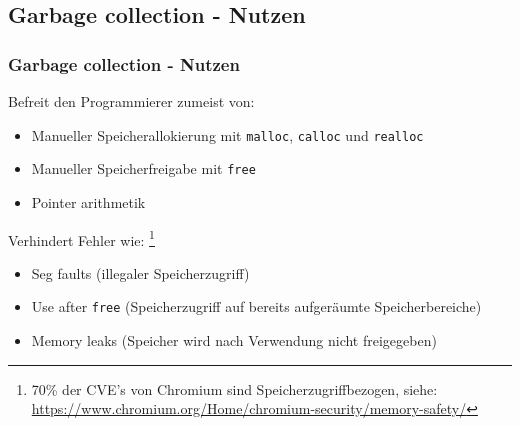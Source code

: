 \documentclass{beamer}
\begin{document}
        \subsection{Garbage collection - Nutzen}
            \begin{frame}
                \frametitle{Garbage collection - Nutzen}

                Befreit den Programmierer zumeist von:
                \begin{itemize}
                    \item Manueller Speicherallokierung mit \texttt{malloc}, \texttt{calloc} und \texttt{realloc}
                    \item Manueller Speicherfreigabe mit \texttt{free}
                    \item Pointer arithmetik
                \end{itemize}

                Verhindert Fehler wie: \footnote{70\% der CVE's von Chromium sind Speicherzugriffbezogen, siehe: \href{https://www.chromium.org/Home/chromium-security/memory-safety/}{https://www.chromium.org/Home/chromium-security/memory-safety/}}
                \begin{itemize}
                    \item Seg faults (illegaler Speicherzugriff) 
                    \item Use after \texttt{free} (Speicherzugriff auf bereits aufgeräumte Speicherbereiche)
                    \item Memory leaks (Speicher wird nach Verwendung nicht freigegeben)
                \end{itemize}
            \end{frame}
\end{document}
